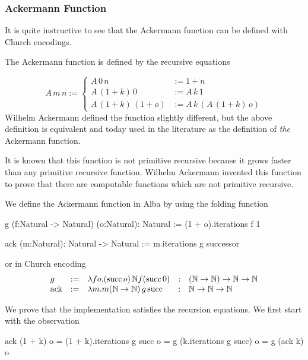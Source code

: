 \subsubsection{Ackermann Function}

It is quite instructive to see that the Ackermann function can be defined with
Church encodings.

The Ackermann function is defined by the recursive equations

$$
A \, m \, n :=
\begin{cases}
  A\, 0\, n &:= 1 + n
  \\
  A\, (1+k)\, 0 &:= A\, k\, 1
  \\
  A\, (1+k)\, (1+o) & := A\, k\, (A\, (1+k)\, o)
\end{cases}
$$
%
Wilhelm Ackermann defined the function slightly different, but the above
definition is equivalent and today used in the literature as the definition of
\emph{the} Ackermann function.

It is known that this function is not primitive recursive because it grows
faster than any primitive recursive function. Wilhelm Ackermann invented this
function to prove that there are computable functions which are not primitive
recursive.

We define the Ackermann function in Alba by using the folding function

\begin{alba}
  g (f:Natural -> Natural) (o:Natural): Natural :=
    (1 + o).iterations f 1

  ack (m:Natural): Natural -> Natural :=
    m.iterations g successor
\end{alba}

or in Church encoding
$$
\begin{array}{lllll}
  g &:=
  & \lambda f o . (\text{succ}\, o)\, \Natural f (\text{succ}\, 0)
  &:& (\Natural \to \Natural) \to \Natural \to \Natural

  \\

  \text{ack} &:=
  & \lambda m. m (\Natural\to\Natural)\, g\, \text{succ}
  &:& \Natural \to \Natural \to \Natural

\end{array}
$$

We prove that the implementation satisfies the recursion equations. We first
start with the observation

\begin{alba}
  ack (1 + k) o  = (1 + k).iterations g succ o
                 = g (k.iterations g succ) o
                 = g (ack k) o
\end{alba}

